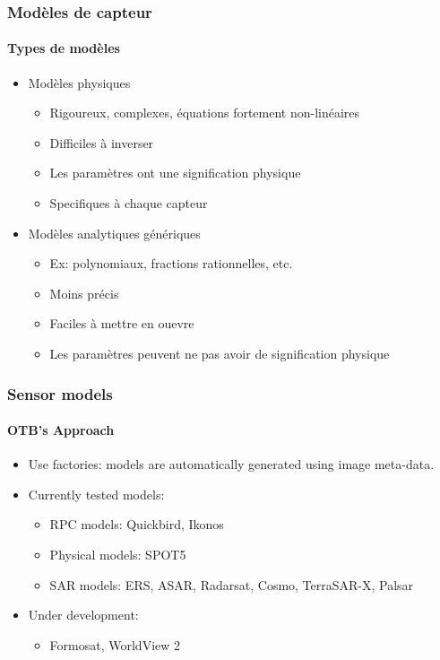 \documentclass[compress]{beamer}
\begin{document}
\begin{frame}
  \frametitle{Modèles de capteur}

  \framesubtitle{Types de modèles}
  \begin{itemize}
    \item Modèles physiques
      \begin{itemize}
	\item Rigoureux, complexes, équations fortement non-linéaires
	\item Difficiles à inverser
	\item Les paramètres ont une signification physique
	\item Specifiques à chaque capteur
      \end{itemize}
    \item Modèles analytiques génériques
      \begin{itemize}
	\item Ex: polynomiaux, fractions rationnelles, etc.
	\item Moins précis
	\item Faciles à mettre en ouevre
	\item Les paramètres peuvent ne pas avoir de signification physique
      \end{itemize}
  \end{itemize}

\end{frame}

\begin{frame}
  \frametitle{Sensor models}

  \framesubtitle{OTB's Approach}
  \begin{itemize}
    \item Use factories: models are automatically generated using
    image meta-data.
    \item Currently tested models:
      \begin{itemize}
	\item RPC models: Quickbird, Ikonos
	\item Physical models: SPOT5
	\item SAR models: ERS, ASAR, Radarsat, Cosmo, TerraSAR-X, Palsar
      \end{itemize}
    \item Under development:
      \begin{itemize}
        \item Formosat, WorldView 2
      \end{itemize}      
  \end{itemize}
\end{frame}
\end{document}
